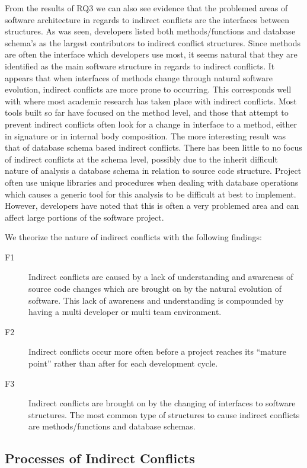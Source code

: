 \documentclass[conference]{IEEEtran}
\begin{document}
From the results of RQ3 we can also see evidence that the problemed areas of software architecture in regards to indirect conflicts are
the interfaces between structures. As was seen, developers listed both methods/functions and database schema's as the largest contributors
to indirect conflict structures. Since methods are often the interface which developers use most, it seems natural that they are identified
as the main software structure in regards to indirect conflicts. It appears that when interfaces of methods change through natural software
evolution, indirect conflicts are more prone to occurring. This corresponds well with where most academic research has taken place with indirect
conflicts. Most tools built so far have focused on the method level, and those that attempt to prevent indirect conflicts often look for a change
in interface to a method, either in signature or in internal body composition. The more interesting result was that of database schema based 
indirect conflicts. There has been little to no focus of indirect conflicts at the schema level, possibly due to the inherit difficult nature
of analysis a database schema in relation to source code structure. Project often use unique libraries and procedures when dealing with
database operations which causes a generic tool for this analysis to be difficult at best to implement. However, developers have noted that this
is often a very problemed area and can affect large portions of the software project. 

We theorize the nature of indirect conflicts with the following findings: 
\begin{description}
	\item[F1] Indirect conflicts are caused by a lack of understanding and awareness of source code changes which are brought on
						by the natural evolution of software. This lack of awareness and understanding is compounded by having a multi developer
						or multi team environment.
	\item[F2] Indirect conflicts occur more often before a project reaches its ``mature point'' rather than after for each development
						cycle.
	\item[F3] Indirect conflicts are brought on by the changing of interfaces to software structures. The most common type of structures
						to cause indirect conflicts are methods/functions and database schemas.
\end{description}


\subsection{Processes of Indirect Conflicts}
\label{sec:pd}
\end{document}
